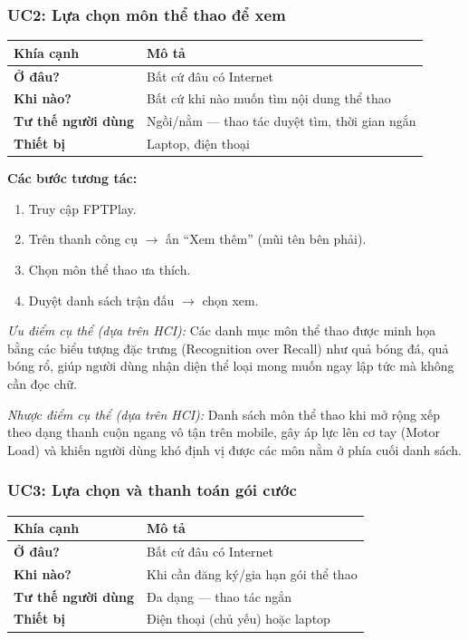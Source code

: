 \subsubsection{UC2: Lựa chọn môn thể thao để xem}

\begin{center}
\begin{tabularx}{\textwidth}{|l|X|}
\hline
\textbf{Khía cạnh} & \textbf{Mô tả} \\
\hline
\textbf{Ở đâu?} & Bất cứ đâu có Internet \\
\hline
\textbf{Khi nào?} & Bất cứ khi nào muốn tìm nội dung thể thao \\
\hline
\textbf{Tư thế người dùng} & Ngồi/nằm --- thao tác duyệt tìm, thời gian ngắn \\
\hline
\textbf{Thiết bị} & Laptop, điện thoại \\
\hline
\end{tabularx}
\end{center}

\medskip\noindent\textbf{Các bước tương tác:}
\begin{enumerate}[leftmargin=2em]
  \item Truy cập FPTPlay.
  \item Trên thanh công cụ $\rightarrow$ ấn ``Xem thêm'' (mũi tên bên phải).
  \item Chọn môn thể thao ưa thích.
  \item Duyệt danh sách trận đấu $\rightarrow$ chọn xem.
\end{enumerate}

\medskip\noindent\textit{Ưu điểm cụ thể (dựa trên HCI):} Các danh mục môn thể thao được minh họa bằng các biểu tượng đặc trưng (Recognition over Recall) như quả bóng đá, quả bóng rổ, giúp người dùng nhận diện thể loại mong muốn ngay lập tức mà không cần đọc chữ.

\medskip\noindent\textit{Nhược điểm cụ thể (dựa trên HCI):} Danh sách môn thể thao khi mở rộng xếp theo dạng thanh cuộn ngang vô tận trên mobile, gây áp lực lên cơ tay (Motor Load) và khiến người dùng khó định vị được các môn nằm ở phía cuối danh sách.

\subsubsection{UC3: Lựa chọn và thanh toán gói cước}

\begin{center}
\begin{tabularx}{\textwidth}{|l|X|}
\hline
\textbf{Khía cạnh} & \textbf{Mô tả} \\
\hline
\textbf{Ở đâu?} & Bất cứ đâu có Internet \\
\hline
\textbf{Khi nào?} & Khi cần đăng ký/gia hạn gói thể thao \\
\hline
\textbf{Tư thế người dùng} & Đa dạng --- thao tác ngắn \\
\hline
\textbf{Thiết bị} & Điện thoại (chủ yếu) hoặc laptop \\
\hline
\end{tabularx}
\end{center}

